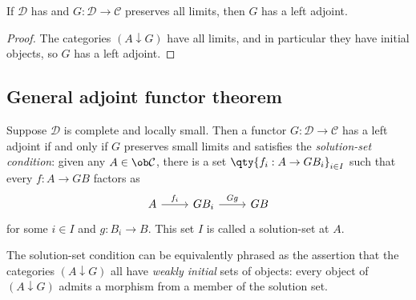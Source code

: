 \begin{proposition}
    If \( \mathcal D \) has and \( G : \mathcal D \to \mathcal C \) preserves all limits, then \( G \) has a left adjoint.
\end{proposition}
\begin{proof}
    The categories \( (A \downarrow G) \) have all limits, and in particular they have initial objects, so \( G \) has a left adjoint.
\end{proof}

\subsection{General adjoint functor theorem}
\begin{theorem}
    Suppose \( \mathcal D \) is complete and locally small.
    Then a functor \( G : \mathcal D \to \mathcal C \) has a left adjoint if and only if \( G \) preserves small limits and satisfies the \emph{solution-set condition}: given any \( A \in \ob \mathcal C \), there is a set \( \qty{f_i : A \to GB_i}_{i \in I} \) such that every \( f : A \to GB \) factors as
\[\begin{tikzcd}
	A & {GB_i} & GB
	\arrow["{f_i}", from=1-1, to=1-2]
	\arrow["Gg", from=1-2, to=1-3]
\end{tikzcd}\]
    for some \( i \in I \) and \( g : B_i \to B \).
    This set \( I \) is called a solution-set at \( A \).
\end{theorem}
The solution-set condition can be equivalently phrased as the assertion that the categories \( (A \downarrow G) \) all have \emph{weakly initial} sets of objects: every object of \( (A \downarrow G) \) admits a morphism from a member of the solution set.
